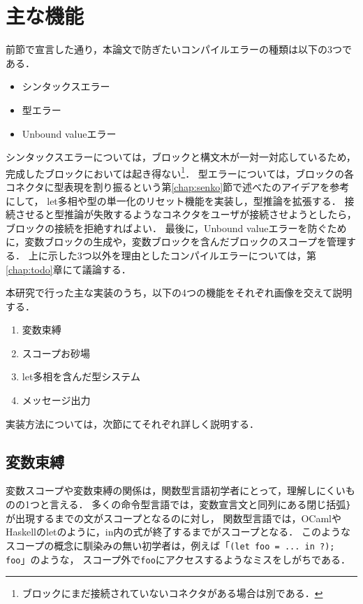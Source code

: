 \chapter{主な機能}\label{chap:features}

前節で宣言した通り，本論文で防ぎたいコンパイルエラーの種類は以下の3つである．
\begin {itemize}
  \item シンタックスエラー
  \item 型エラー
  \item Unbound valueエラー
\end {itemize}

シンタックスエラーについては，ブロックと構文木が一対一対応しているため，
完成したブロックにおいては起き得ない\footnote{ブロックにまだ接続されていないコネクタがある場合は別である．}．
型エラーについては，ブロックの各コネクタに型表現を割り振るという第\ref{chap:senko}節で述べた\cite{Typed-Blockly}のアイデアを参考にして，
let多相や型の単一化のリセット機能を実装し，型推論を拡張する．
接続させると型推論が失敗するようなコネクタをユーザが接続させようとしたら，ブロックの接続を拒絶すればよい．
最後に，Unbound valueエラーを防ぐために，変数ブロックの生成や，変数ブロックを含んだブロックのスコープを管理する．
上に示した3つ以外を理由としたコンパイルエラーについては，第\ref{chap:todo}章にて議論する．

本研究で行った主な実装のうち，以下の4つの機能をそれぞれ画像を交えて説明する．
\begin {enumerate}
  \item 変数束縛
  \item スコープお砂場
  \item let多相を含んだ型システム
  \item メッセージ出力
\end {enumerate}
実装方法については，次節にてそれぞれ詳しく説明する．

\section {変数束縛}
変数スコープや変数束縛の関係は，関数型言語初学者にとって，理解しにくいものの1つと言える．
多くの命令型言語では，変数宣言文と同列にある閉じ括弧{\tt \}}が出現するまでの文がスコープとなるのに対し，
関数型言語では，OCamlやHaskellのletのように，in内の式が終了するまでがスコープとなる．
このようなスコープの概念に馴染みの無い初学者は，例えば「{\tt (let foo = ...\ in ?); foo}」のような，
スコープ外で{\tt foo}にアクセスするようなミスをしがちである．

